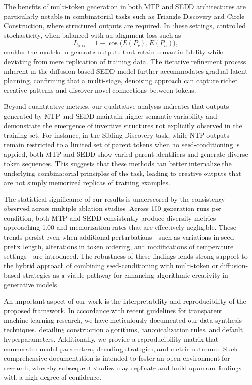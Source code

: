 \documentclass{article} %
\begin{document}
The benefits of multi-token generation in both MTP and SEDD architectures are particularly notable in combinatorial tasks such as Triangle Discovery and Circle Construction, where structured outputs are required. In these settings, controlled stochasticity, when balanced with an alignment loss such as 
\[
L_{\text{mix}} = 1 - \cos\big(E(P_r), E(P_a)\big),
\]
enables the models to generate outputs that retain semantic fidelity while deviating from mere replication of training data. The iterative refinement process inherent in the diffusion-based SEDD model further accommodates gradual latent planning, confirming that a multi-stage, denoising approach can capture richer creative patterns and discover novel connections between tokens.

Beyond quantitative metrics, our qualitative analysis indicates that outputs generated by MTP and SEDD maintain higher semantic variability and demonstrate the emergence of inventive structures not explicitly observed in the training set. For instance, in the Sibling Discovery task, while NTP outputs remain restricted to a limited set of parent tokens when no seed-conditioning is applied, both MTP and SEDD show varied parent identifiers and generate diverse token sequences. This suggests that these methods can better internalize the underlying combinatorial principles of the task, leading to creative outputs that are not simply memorized replicas of training examples.

The statistical significance of our results is underscored by the consistency observed across multiple ablation studies. Across 100 generation runs per condition, both MTP and SEDD consistently produce diversity metrics approaching 1.00 and memorization rates that are effectively negligible. These trends persist even when additional perturbations—such as variations in seed prefix length, alterations in token ordering, and modifications of temperature settings—are introduced. The robustness of these findings lends strong support to the hybrid approach of combining seed-conditioning with multi-token or diffusion-based strategies as a viable pathway for enhancing algorithmic creativity in generative models.

An important aspect of our work is the interpretability and reproducibility of the proposed framework. In accordance with recent guidelines for transparent machine learning research, we have meticulously documented our data synthesis techniques, detailing construction algorithms, canonicalization rules, and default hyperparameters. Additionally, we provide a reproducibility matrix that enumerates model parameters, decoding strategies, and metric outcomes. Such comprehensive documentation is intended to foster an open environment for research, whereby subsequent studies may replicate and build upon our findings with a high degree of confidence.
\end{document}
